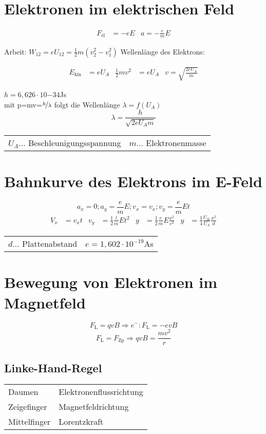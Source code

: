 	\section{Elektronen im elektrischen Feld}
		\begin{align*}
			F_{\text{el}}&= -eE & a=-\frac{e}{m}E
		\end{align*}

		Arbeit: $W_{12}=eU_{12}=\frac{1}{2}m(v_2^2-v_1^2)$
		Wellenlänge des Elektrons:

		\begin{align*}
			E_{\text{kin}}&= eU_A & \frac{1}{2}mv^2&= eU_A & v=\sqrt{\frac{2eU_A}{m}}
		\end{align*}

		$h=6,626\cdot10{-34}$Js \\
		mit p=mv=$\nicefrac{h}{\lambda}$ folgt die Wellenlänge $\lambda=f(U_A)$
		\[
			\lambda=\frac{h}{\sqrt{2eU_Am}}
		\]
		\begin{table}[h]
		\begin{tabular}{ll}
		$U_A\dots$ Beschleunigungsspannung & $m\dots$ Elektronenmasse\\
		\end{tabular}
		\end{table}

	\section{Bahnkurve des Elektrons im E-Feld}
		\[
			a_x=0; a_y=\frac{e}{m}E; v_x=v_x;v_y=\frac{e}{m}Et
		\]
		\begin{align*}
			V_x&= v_xt & v_y&= \frac{1}{2}\frac{l}{m}Et^2 & y&= \frac{1}{2}\frac{e}{m}E\frac{x^2}{v^2} & y&= \frac{1}{4}\frac{U_K}{U_A}\frac{x^2}{d}
		\end{align*}
		\begin{table}[h]
		\begin{tabular}{ll}
		$d\dots$ Plattenabstand & $e=1,602\cdot10^{-19}$As\\
		\end{tabular}
		\end{table}
	
	\section{Bewegung von Elektronen im Magnetfeld}
		\[
			F_{\text{L}}=qvB \Rightarrow e^-:F_{\text{L}}=-evB
		\]
		\[
			F_{\mathrm{L}}=F_{\mathrm{Zp}} \Rightarrow qvB=\frac{mv^2}{r}
		\]
		\subsection{Linke-Hand-Regel}
			\begin{tabularx}{\textwidth}{l l}
				Daumen & Elektronenflussrichtung\\
				Zeigefinger & Magnetfeldrichtung\\
				Mittelfinger & Lorentzkraft\\
			\end{tabularx}
        
